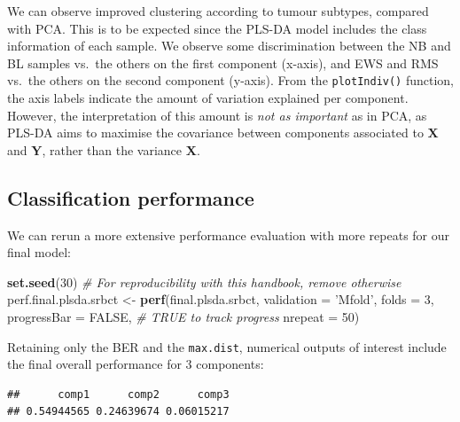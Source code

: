 \documentclass[]{book}
\newenvironment{Shaded}{\begin{snugshade}}{\end{snugshade}}
\newcommand{\KeywordTok}[1]{\textcolor[rgb]{0.13,0.29,0.53}{\textbf{#1}}}
\newcommand{\DataTypeTok}[1]{\textcolor[rgb]{0.13,0.29,0.53}{#1}}
\newcommand{\DecValTok}[1]{\textcolor[rgb]{0.00,0.00,0.81}{#1}}
\newcommand{\StringTok}[1]{\textcolor[rgb]{0.31,0.60,0.02}{#1}}
\newcommand{\CommentTok}[1]{\textcolor[rgb]{0.56,0.35,0.01}{\textit{#1}}}
\newcommand{\OtherTok}[1]{\textcolor[rgb]{0.56,0.35,0.01}{#1}}
\newcommand{\OperatorTok}[1]{\textcolor[rgb]{0.81,0.36,0.00}{\textbf{#1}}}
\newcommand{\NormalTok}[1]{#1}
\begin{document}
We can observe improved clustering according to tumour subtypes,
compared with PCA. This is to be expected since the PLS-DA model
includes the class information of each sample. We observe some
discrimination between the NB and BL samples vs.~the others on the first
component (x-axis), and EWS and RMS vs.~the others on the second
component (y-axis). From the \texttt{plotIndiv()} function, the axis
labels indicate the amount of variation explained per component.
However, the interpretation of this amount is \emph{not as important} as
in PCA, as PLS-DA aims to maximise the covariance between components
associated to \(\boldsymbol X\) and \(\boldsymbol Y\), rather than the
variance \(\boldsymbol X\).

\subsection{Classification performance}\label{plsda:perf}

We can rerun a more extensive performance evaluation with more repeats
for our final model:

\begin{Shaded}
\begin{Highlighting}[]
\KeywordTok{set.seed}\NormalTok{(}\DecValTok{30}\NormalTok{) }\CommentTok{# For reproducibility with this handbook, remove otherwise}
\NormalTok{perf.final.plsda.srbct <-}\StringTok{ }\KeywordTok{perf}\NormalTok{(final.plsda.srbct, }\DataTypeTok{validation =} \StringTok{'Mfold'}\NormalTok{, }
                               \DataTypeTok{folds =} \DecValTok{3}\NormalTok{, }
                               \DataTypeTok{progressBar =} \OtherTok{FALSE}\NormalTok{, }\CommentTok{# TRUE to track progress}
                               \DataTypeTok{nrepeat =} \DecValTok{50}\NormalTok{) }
\end{Highlighting}
\end{Shaded}

Retaining only the BER and the \texttt{max.dist}, numerical outputs of
interest include the final overall performance for 3 components:

\begin{Shaded}
\end{Shaded}

\begin{verbatim}
##      comp1      comp2      comp3 
## 0.54944565 0.24639674 0.06015217
\end{verbatim}
\end{document}
